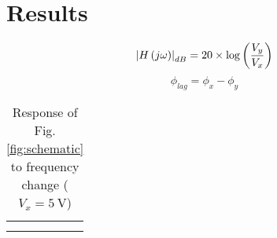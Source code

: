 \section{Results}\label{sec:results}
\begin{equation}
	\left| H \left( j \omega \right) \right|_{dB} = 20 \times \log \left( {V_y \over V_x} \right)
\end{equation}
\begin{equation*}
	\phi_{lag} = \phi_x - \phi_y
\end{equation*}

\begin{table}[htpb]
	\centering
	\begin{tabular}{@{}SSSS@{}}
		\toprule
			 & 
			 &
			\textcol{$\tfmag$} &
			 \\
		\midrule
		&  &  &  \\
		&  &  &  \\ 
		\bottomrule
	\end{tabular}
	\caption{Response of Fig. \ref{fig:schematic} to frequency change ($V_x = \SI{5}{\volt}$)}
	\label{table:data}
\end{table}


